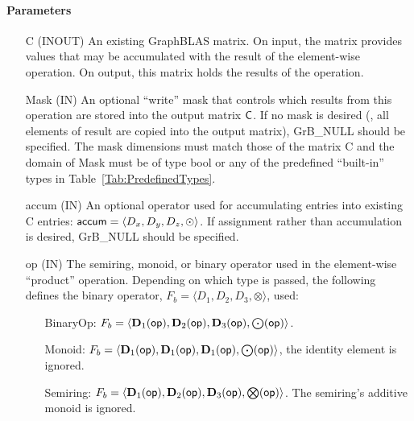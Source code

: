\paragraph{Parameters}

\begin{itemize}[leftmargin=1.1in]
    \item[{\sf C}]    ({\sf INOUT}) An existing GraphBLAS matrix.  On input,
    the matrix provides values that may be accumulated with the result of the
    element-wise operation.  On output, this matrix holds the results of the
    operation.
    
    \item[{\sf Mask}]  ({\sf IN}) An optional ``write'' mask that controls which
    results from this operation are stored into the output matrix
    ${\sf C}$.  If no mask is desired (\ie, all elements
    of result are copied into the output matrix), {\sf GrB\_NULL}
    should be specified. The mask dimensions must match those of the
    matrix {\sf C} and the domain of {\sf Mask} must be
    of type {\sf bool} or any of the predefined ``built-in'' types in
    Table~\ref{Tab:PredefinedTypes}.

    \item[{\sf accum}] ({\sf IN}) An optional operator used for accumulating
    entries into existing {\sf C} entries: ${\sf accum} = \langle D_x,
    D_y, D_z,\odot \rangle$. If assignment rather than accumulation is
    desired, {\sf GrB\_NULL} should be specified.

    \item[{\sf op}]    ({\sf IN}) The semiring, monoid, or binary operator 
    used in the element-wise ``product'' operation.  Depending on which type is
    passed, the following defines the binary operator, $F_b=\langle D_1,D_2,D_3,\otimes\rangle$, used:
    \begin{itemize}[leftmargin=1.1in]
    \item[BinaryOp:] $F_b = \langle \bold{D}_1({\sf op}), \bold{D}_2({\sf op}),
    \bold{D}_3({\sf op}),\bold{\bigodot}({\sf op})\rangle$.  
    \item[Monoid:] $F_b = \langle \bold{D}_1({\sf op}), \bold{D}_1({\sf op}),
    \bold{D}_1({\sf op}),\bold{\bigodot}({\sf op})\rangle$,
    the identity element is ignored. 
    \item[Semiring:] $F_b = \langle \bold{D}_1({\sf op}), \bold{D}_2({\sf op}),
    \bold{D}_3({\sf op}),\bold{\bigotimes}({\sf op})\rangle$.  The semiring's
    additive monoid is ignored.
    \end{itemize}
    

\end{itemize}
